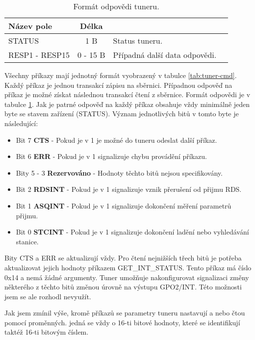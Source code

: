 \begin{table}[ht!]
\begin{center}
\begin{tabular}{|l|c|l|l|}
\hline 
Název pole & Délka &  \\ 
\hline
STATUS & 1 B & Status tuneru.\\
\hline
RESP1 - RESP15 & 0 - 15 B & Případná další data odpovědi.\\
\hline
\end{tabular} 
\end{center}
\caption{Formát odpovědi tuneru.}
\label{tab:tuner-rpl} 
\end{table}

Všechny příkazy mají jednotný formát vyobrazený v tabulce \ref{tab:tuner-cmd}. Každý příkaz je jednou transakcí zápisu na \iic sběrnici. Případnou odpověď na příkaz je možné získat následnou transakcí čtení z \iic sběrnice. Formát odpovědi je v tabulce \ref{tab:tuner-rpl}. Jak je patrné odpověď na každý příkaz obsahuje vždy minimálně jeden byte se stavem zařízení (STATUS). Význam jednotlivých bitů v tomto byte je následující:

\begin{itemize}
\item Bit 7 \textbf{CTS} - Pokud je v 1 je možné do tuneru odeslat další příkaz.
\item Bit 6 \textbf{ERR} - Pokud je v 1 signalizuje chybu provádění příkazu.
\item Bity 5 - 3 \textbf{Rezervováno} - Hodnoty těchto bitů nejsou specifikovány.
\item Bit 2 \textbf{RDSINT} - Pokud je v 1 signalizuje vznik přerušení od přijmu RDS.
\item Bit 1 \textbf{ASQINT} - Pokud je v 1 signalizuje dokončení měření parametrů přijmu.
\item Bit 0 \textbf{STCINT} - Pokud je v 1 signalizuje dokončení ladění nebo vyhledávání stanice.
\end{itemize}  

Bity CTS a ERR se aktualizují vždy. Pro čtení nejnižších třech bitů je potřeba aktualizovat jejich hodnoty příkazem GET\_INT\_STATUS. Tento příkaz má číslo 0x14 a nemá žádné argumenty. Tuner umožňuje nakonfigurovat signalizaci změny některého z těchto bitů změnou úrovně na výstupu GPO2/INT. Této možnosti jsem se ale rozhodl nevyužít.

Jak jsem zmínil výše, kromě příkazů se parametry tuneru nastavují a nebo čtou pomocí proměnných. jedná se vždy o 16-ti bitové hodnoty, které se identifikují taktéž 16-ti bitovým číslem. 

